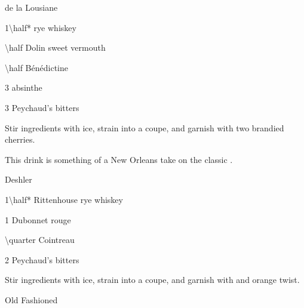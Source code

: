 \begin{Cocktail}[\PDT]{de la Lousiane}
  \begin{Ingredients}
  \item \SI{1\half*}{\oz} rye whiskey
  \item \SI{\half}{\oz} Dolin sweet vermouth
  \item \SI{\half}{\oz} B\'en\'edictine
  \item 3 \si{\dashes} absinthe
  \item 3 \si{\dashes} Peychaud's bitters
  \end{Ingredients}
  
  \begin{Instructions}
	Stir ingredients with ice, strain into a coupe, and garnish with two brandied cherries.
	
	This drink is something of a New Orleans take on the classic .
  \end{Instructions}
\end{Cocktail}

\begin{Cocktail}[\PDT]{Deshler}
  \begin{Ingredients}
  \item \SI{1\half*}{\oz} Rittenhouse rye whiskey
  \item \SI{1}{\oz} Dubonnet rouge
  \item \SI{\quarter}{\oz} Cointreau
  \item 2 \si{\dashes} Peychaud's bitters
  \end{Ingredients}
  
  \begin{Instructions}
	Stir ingredients with ice, strain into a coupe, and garnish with and orange twist.
  \end{Instructions}
\end{Cocktail}

\begin{AltCocktail}{Old Fashioned}
  \begin{Ingredients}
  \item
  \end{Ingredients}
  
  \begin{Instructions}
	
  \end{Instructions}
\end{AltCocktail}

